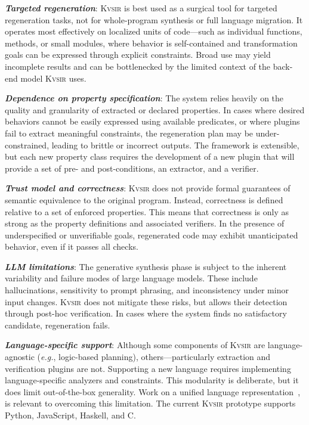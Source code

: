\documentclass[nonacm,sigplan,review]{acmart}
\def\eg{{\em e.g.}, }
\newcommand{\sys}{{\scshape Kv{\textalpha}sir}\xspace}
\newcommand{\heading}[1]{\vspace{2pt}\noindent\textbf{\emph{#1}}:\enspace}
\begin{document}
\heading{Targeted regeneration}
\sys is best used as a surgical tool for targeted regeneration tasks, not for whole-program synthesis or full language migration.
It operates most effectively on localized units of code---such as individual functions, methods, or small modules, where behavior is self-contained and transformation goals can be expressed through explicit constraints.
Broad use may yield incomplete results and can be bottlenecked by the limited context of the back-end model \sys uses.

\heading{Dependence on property specification}
The system relies heavily on the quality and granularity of extracted or declared properties.
In cases where desired behaviors cannot be easily expressed using available predicates, or where plugins fail to extract meaningful constraints, the regeneration plan may be under-constrained, leading to brittle or incorrect outputs. The framework is extensible, but each new property class requires the development of a new plugin that will provide a set of pre- and post-conditions, an extractor, and a verifier.

\heading{Trust model and correctness}
\sys
does not provide formal guarantees
of semantic equivalence
to the original program.
Instead,
correctness is defined relative to a set of enforced properties.
This means that correctness is only as strong as the property definitions and associated verifiers.
In the presence of underspecified or unverifiable goals,
regenerated code
may exhibit unanticipated behavior,
even if it passes all checks. 


\heading{LLM limitations}
The generative synthesis phase
is subject to the inherent variability and failure modes
of large language models.
These include hallucinations,
sensitivity to prompt phrasing,
and inconsistency
under minor input changes.
\sys does not mitigate these risks,
but allows their detection
through post-hoc verification.
In cases where the system finds no satisfactory candidate,
regeneration fails.


\heading{Language-specific support}
Although some components of \sys are language-agnostic (\eg logic-based planning),
others---particularly extraction and verification plugins are not.
Supporting a new language
requires implementing language-specific analyzers and constraints.
This modularity is deliberate,
but it does limit out-of-the-box generality.
Work on a unified language representation~\cite{koppel2018onetool,bap2011,dillig2009sail},
is relevant to overcoming this limitation.
The current \sys prototype
supports Python, JavaScript, Haskell, and C. 
\end{document}
